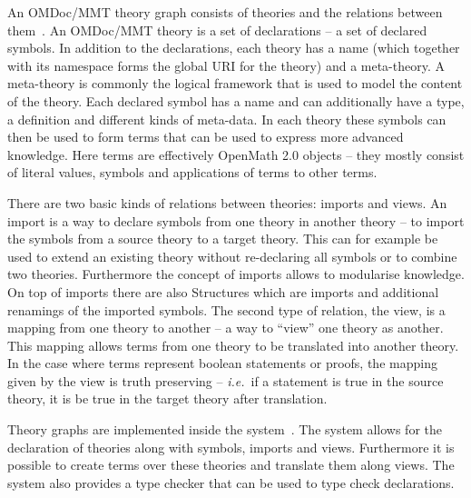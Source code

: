 An OMDoc/MMT theory graph consists of theories and the relations between
them~\cite{RabKoh:WSMSML13}. An OMDoc/MMT theory is a set of declarations -- a set of
declared symbols. In addition to the declarations, each theory has a name (which together
with its namespace forms the global URI for the theory) and a meta-theory. A meta-theory
is commonly the logical framework that is used to model the content of the theory. Each
declared symbol has a name and can additionally have a type, a definition and different
kinds of meta-data. In each theory these symbols can then be used to form terms that can
be used to express more advanced knowledge. Here terms are effectively OpenMath 2.0
\cite{BusCapCar:2oms04} objects -- they mostly consist of literal values, symbols and
applications of terms to other terms.

There are two basic kinds of relations between theories: imports and views. An import is a
way to declare symbols from one theory in another theory -- to import the symbols from a
source theory to a target theory. This can for example be used to extend an existing
theory without re-declaring all symbols or to combine two theories. Furthermore the
concept of imports allows to modularise knowledge. On top of imports there are also
Structures which are imports and additional renamings of the imported symbols. The second
type of relation, the view, is a mapping from one theory to another -- a way to ``view''
one theory as another. This mapping allows terms from one theory to be translated into
another theory. In the case where terms represent boolean statements or proofs, the
mapping given by the view is truth preserving -- \emph{i.e.}~if a statement is true in the
source theory, it is be true in the target theory after translation.

Theory graphs are implemented inside the \MMT system~\cite{Rabe:MAGMS13,uniformal:on}. The
system allows for the declaration of theories along with symbols, imports and
views. Furthermore it is possible to create terms over these theories and translate them
along views. The \MMT system also provides a type checker that can be used to type check
declarations.